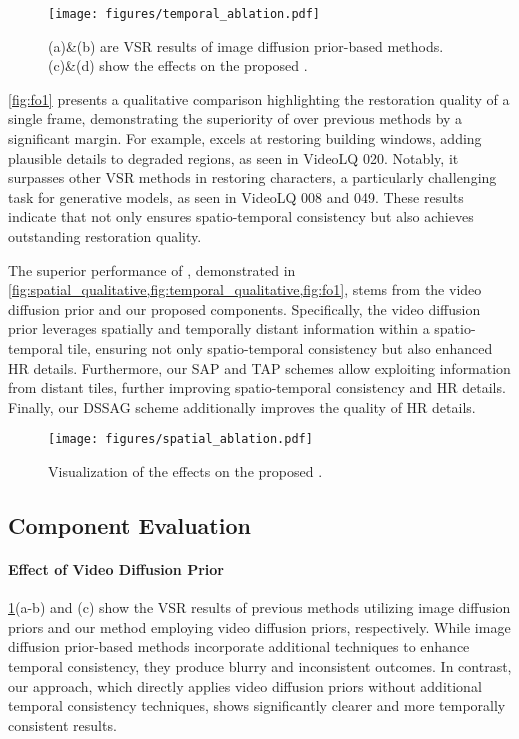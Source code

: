 \begin{figure}[t]
    \centering
    \texttt{[image: figures/temporal\_ablation.pdf]}
    \vspace{-2mm}
    \caption{(a)\&(b) are VSR results of image diffusion prior-based methods. (c)\&(d) show the effects on the proposed {\tfiabb}.}
    \label{fig:temporal_ablation}
    \vspace{-2mm}
\end{figure}

\cref{fig:fo1} presents a qualitative comparison highlighting the restoration quality of a single frame, demonstrating the superiority of {\ours} over previous methods by a significant margin. For example, {\ours} excels at restoring building windows, adding plausible details to degraded regions, as seen in VideoLQ 020. Notably, it surpasses other VSR methods in restoring characters, a particularly challenging task for generative models, as seen in  VideoLQ 008 and 049. These results indicate that {\ours} not only ensures spatio-temporal consistency but also achieves outstanding restoration quality.

The superior performance of {\ours}, demonstrated in \cref{fig:spatial_qualitative,fig:temporal_qualitative,fig:fo1}, stems from the video diffusion prior and our proposed components.
Specifically, the video diffusion prior leverages spatially and temporally distant information within a spatio-temporal tile, ensuring not only spatio-temporal consistency but also enhanced HR details.
Furthermore, our SAP and TAP schemes allow exploiting information from distant tiles, further improving spatio-temporal consistency and HR details.
Finally, our DSSAG scheme additionally improves the quality of HR details.

\begin{figure}[t]
    \centering
    \texttt{[image: figures/spatial\_ablation.pdf]}
    \vspace{-2mm}
    \caption{Visualization of the effects on the proposed {\ssiabb}.}
    \label{fig:spatial_ablation}
    \vspace{-4mm}
\end{figure}


\subsection{Component Evaluation}
\label{ssec:ablation_study}

\paragraph{Effect of Video Diffusion Prior}
\cref{fig:temporal_ablation}(a-b) and (c) show the VSR results of previous methods utilizing image diffusion priors and our method employing video diffusion priors, respectively. While image diffusion prior-based methods incorporate additional techniques to enhance temporal consistency, they produce blurry and inconsistent outcomes. In contrast, our approach, which directly applies video diffusion priors without additional temporal consistency techniques, shows significantly clearer and more temporally consistent results.

